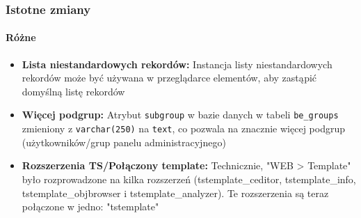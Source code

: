 \begin{frame}[fragile]
	\frametitle{Istotne zmiany}
	\framesubtitle{Różne}

	\begin{itemize}

		\item \textbf{Lista niestandardowych rekordów:}\newline
			\small
				Instancja listy niestandardowych rekordów może być używana w przeglądarce elementów, aby zastąpić domyślną listę rekordów
			\normalsize

		\item \textbf{Więcej podgrup:}\newline
			\small
				Atrybut \texttt{subgroup} w bazie danych w tabeli \texttt{be\_groups} zmieniony z \texttt{varchar(250)} na \texttt{text}, co pozwala na znacznie więcej podgrup (użytkowników/grup panelu administracyjnego)
			\normalsize

		\item \textbf{Rozszerzenia TS/Połączony template:}\newline
			\small
				Technicznie, "WEB > Template" było rozprowadzone na kilka rozszerzeń (tstemplate\_ceditor, tstemplate\_info, tstemplate\_objbrowser i tstemplate\_analyzer). Te rozszerzenia są teraz połączone w jedno: "tstemplate"
			\normalsize

	\end{itemize}
	
\end{frame}


